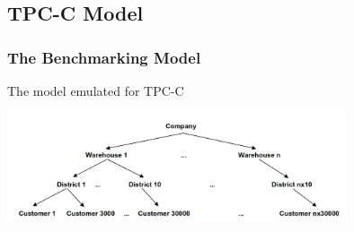 \documentclass[12pt]{beamer}
\begin{document}
\subsection{TPC-C Model}
\begin{frame}[c]
\frametitle{The Benchmarking Model}
The model emulated for TPC-C\\
\centering
   \includegraphics[width=10cm, height=4cm]{images/model}

\end{frame}

\end{document}
